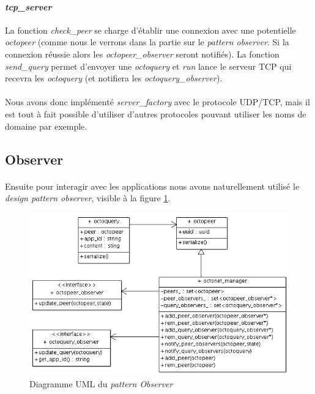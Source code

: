 \documentclass[a4paper]{article}
\begin{document}
			\paragraph{\textit{tcp\_server}}{
			La fonction \textit{check\_peer} se charge d’établir une connexion avec une potentielle \textit{octopeer}
			(comme nous le verrons dans la partie sur le \textit{pattern observer}. Si la connexion réussie alors les
			\textit{octopeer\_observer} seront notifiés). La fonction \textit{send\_query} permet d’envoyer une
			\textit{octoquery} et \textit{run} lance le serveur TCP qui recevra les \textit{octoquery} 
			(et notifiera les \textit{octoquery\_observer}).
			}
			
			\paragraph{}{
			Nous avons donc implémenté \textit{server\_factory} avec le protocole UDP/TCP, mais il est tout à fait 
			possible d’utiliser d’autres protocoles pouvant utiliser les noms de domaine par exemple.
			}

		\subsection{Observer}
		
			\paragraph{}{
			Ensuite pour interagir avec les applications nous avons naturellement utilisé le 
			\textit{design pattern observer}, visible à la figure \ref{observer_uml}.
			}

			\begin{figure}[!ht]
				\centering
				\includegraphics[scale=0.65]{UML/octonet_observer1.png}
				\caption{\label{observer_uml} Diagramme UML du \textit{pattern Observer}}
			\end{figure}
			
\end{document}
